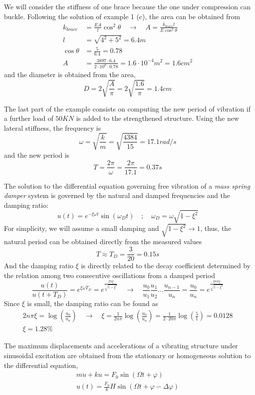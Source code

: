 \documentclass{problems}
\begin{document}
We will consider the stiffness of one brace because the one under compression can buckle. 
Following the solution of example 1 (c), the area can be obtained from
\begin{align*}
k_{brace} &= \frac{EA}{l}\cos^2\theta \quad \rightarrow \quad A = \frac{k_{brace}l}{E\cos^2\theta} \\
l &= \sqrt{4^2 + 5^2} = 6.4m \\
\cos\theta &= \frac{5}{6.4} = 0.78 \\
A &= \frac{3897\cdot 6.4}{2\cdot 10^8\cdot 0.78} = 1.6\cdot 10^{-4} m^2 = 1.6cm^2
\end{align*}
and the diameter is obtained from the area,
$$
D = 2\sqrt{\frac{A}{\pi}} = 2\sqrt{\frac{1.6}{\pi}} = 1.4cm
$$

The last part of the example consists on computing the new period of vibration if a further load of $50KN$ is added to the strengthened structure. Using the new lateral stiffness, the frequency is
$$
\omega = \sqrt{\frac{k}{m}} = \sqrt{\frac{4384}{15}} = 17.1 rad/s
$$
and the new period is
$$
T = \frac{2\pi}{\omega} = \frac{2\pi}{17.1} = 0.37s
$$



The solution to the differential equation governing free vibration of a \emph{mass spring damper} system is governed by the natural and damped frequencies and the damping ratio:
$$
u(t) = e^{-\xi\omega t}\sin(\omega_D t) \quad ; \quad \omega_D = \omega\sqrt{1-\xi^2}
$$
For simplicity, we will assume a small damping and $\sqrt{1-\xi^2}\rightarrow1$, thus, the natural period can be obtained directly from the measured values
$$
T \approx T_D = \frac{3}{20} = 0.15s
$$
And the damping ratio $\xi$ is directly related to the decay coefficient determined by the relation among two consecutive oscillations from a damped period
$$
\frac{u(t)}{u(t+T_D)} = e^{\xi\omega T_D} = e^{\frac{2\pi\xi}{\sqrt{1-\xi^2}}} \quad \rightarrow \quad
\frac{u_0}{u_1} \frac{u_1}{u_2} \dots \frac{u_{n-1}}{u_n} = \frac{u_0}{u_n} = e^{\frac{2n\pi\xi}{\sqrt{1-\xi^2}}}
$$
Since $\xi$ is small, the damping ratio can be found as
\begin{align*}
2n\pi\xi = \log\left(\frac{u_0}{u_n}\right) \quad \rightarrow \quad
\xi = \frac{1}{2n\pi} \log\left(\frac{u_0}{u_n}\right) = \frac{1}{2\cdot20\pi} \log\left(\frac{5}{1}\right) = 0.0128 \\
\xi = 1.28\%
\end{align*}



The maximum displacements and accelerations of a vibrating structure under sinusoidal excitation are obtained from the stationary or homogeneous solution to the differential equation,
\begin{align*}
m\ddot{u} + ku = F_0\sin(\Omega t + \varphi) \\
u(t) = \frac{F_0}{k}H\sin(\Omega t + \varphi - \Delta\varphi)
\end{align*}
\end{document}
